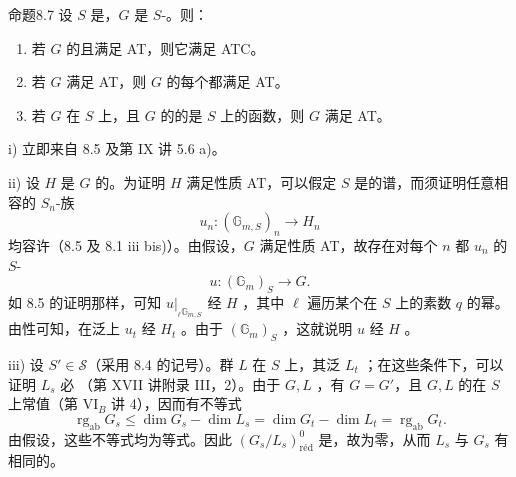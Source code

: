 \begin{SGAresult}{命题}{8.7}
设 $S$ 是，$G$ 是 $S$-。则：
\begin{enumerate}
\item[i)] 若 $G$ 的且满足 AT，则它满足 ATC。
\item[ii)] 若 $G$ 满足 AT，则 $G$ 的每个都满足 AT。
\item[iii)] 若 $G$ 在 $S$ 上，且 $G$ 的的是 $S$ 上的函数，则 $G$ 满足 AT。
\end{enumerate}
\end{SGAresult}
i) 立即来自 8.5 及第 IX 讲 5.6 a)。

ii) 设 $H$ 是 $G$ 的。为证明 $H$ 满足性质 AT，可以假定 $S$ 是的谱，而须证明任意相容的 $S_n$-族
\[u_n:(\mathbb G_{m,S})_n\longrightarrow H_n\]
均容许（8.5 及 8.1 iii bis)）。由假设，$G$ 满足性质 AT，故存在对每个 $n$ 都 $u_n$ 的 $S$-
\[u:(\mathbb G_m)_S\longrightarrow G.\]
如 8.5 的证明那样，可知 $u|_{{}_\ell\mathbb G_{m,S}}$ 经 $H$ ，其中 $\ell$ 遍历某个在 $S$ 上的素数 $q$ 的幂。由性可知，在泛上 $u_t$ 经 $H_t$ 。由于 $(\mathbb G_m)_S$ ，这就说明 $u$ 经 $H$ 。

iii) 设 $S'\in\mathscr S$（采用 8.4 的记号）。群 $L$ 在 $S$ 上，其泛 $L_t$ ；在这些条件下，可以证明 $L_s$ 必
（第 XVII 讲附录 III，2）。由于 $G,L$ ，有 $G=G'$，且 $G,L$ 的在 $S$ 上常值（第 VI$_B$ 讲 4），因而有不等式
\[\operatorname{rg}_{\mathrm{ab}}G_s\leq\dim G_s-\dim L_s=\dim G_t-\dim L_t=\operatorname{rg}_{\mathrm{ab}}G_t.\]
由假设，这些不等式均为等式。因此 $(G_s/L_s)^0_{\mathrm{r\text{é}d}}$ 是，故为零，从而 $L_s$ 与 $G_s$ 有相同的。


